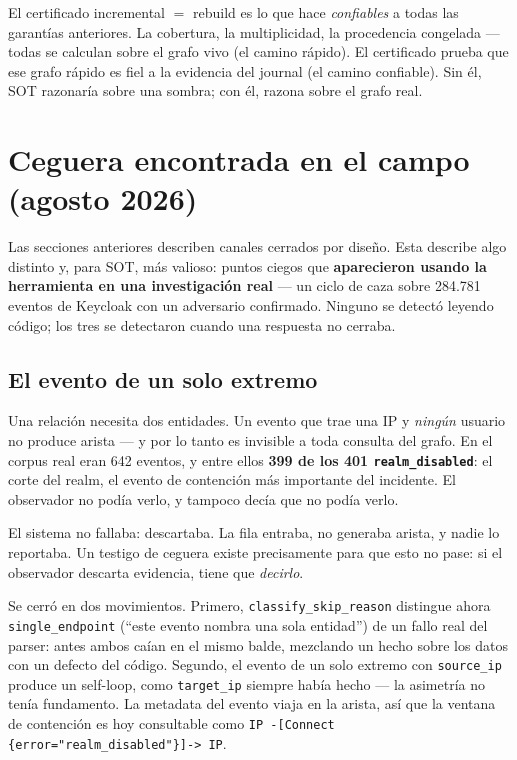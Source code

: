 \documentclass[11pt,a4paper]{article}
\newcommand{\code}[1]{\texttt{\small #1}}
\begin{document}
\begin{ideabox}
El certificado incremental $=$ rebuild es lo que hace \emph{confiables} a todas
las garantías anteriores. La cobertura, la multiplicidad, la procedencia
congelada --- todas se calculan sobre el grafo vivo (el camino rápido). El
certificado prueba que ese grafo rápido es fiel a la evidencia del journal (el
camino confiable). Sin él, SOT razonaría sobre una sombra; con él, razona sobre
el grafo real.
\end{ideabox}

\section{Ceguera encontrada en el campo (agosto 2026)}
\label{sec:campo}

Las secciones anteriores describen canales cerrados por diseño. Esta describe
algo distinto y, para SOT, más valioso: puntos ciegos que \textbf{aparecieron
usando la herramienta en una investigación real} --- un ciclo de caza sobre
284.781 eventos de Keycloak con un adversario confirmado. Ninguno se detectó
leyendo código; los tres se detectaron cuando una respuesta no cerraba.

\subsection{El evento de un solo extremo}

Una relación necesita dos entidades. Un evento que trae una IP y \emph{ningún}
usuario no produce arista --- y por lo tanto es invisible a toda consulta del
grafo. En el corpus real eran 642 eventos, y entre ellos \textbf{399 de los 401
\code{realm\_disabled}}: el corte del realm, el evento de contención más
importante del incidente. El observador no podía verlo, y tampoco decía que no
podía verlo.

\begin{warnbox}
El sistema no fallaba: descartaba. La fila entraba, no generaba arista, y nadie
lo reportaba. Un testigo de ceguera existe precisamente para que esto no pase:
si el observador descarta evidencia, tiene que \emph{decirlo}.
\end{warnbox}

Se cerró en dos movimientos. Primero, \code{classify\_skip\_reason} distingue
ahora \code{single\_endpoint} (``este evento nombra una sola entidad'') de un
fallo real del parser: antes ambos caían en el mismo balde, mezclando un hecho
sobre los datos con un defecto del código. Segundo, el evento de un solo
extremo con \code{source\_ip} produce un self-loop, como \code{target\_ip}
siempre había hecho --- la asimetría no tenía fundamento. La metadata del
evento viaja en la arista, así que la ventana de contención es hoy consultable
como \code{IP -[Connect \{error="realm\_disabled"\}]-> IP}.
\end{document}
